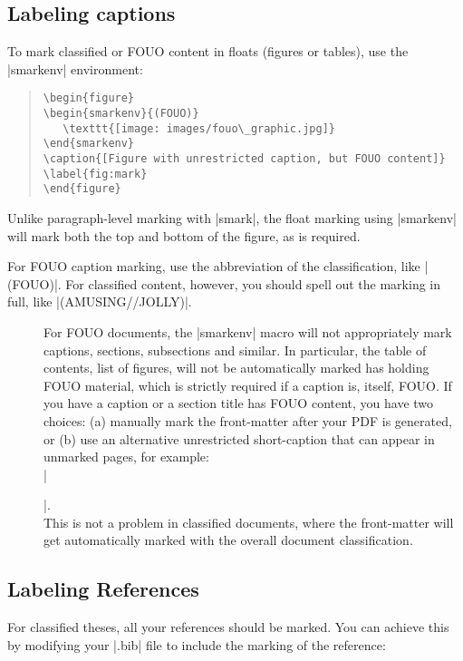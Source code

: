 \subsection{Labeling captions}
To mark classified or FOUO content in floats (figures or tables), use
the |smarkenv| environment:

\begin{quotation}
\begin{Verbatim}[fontsize=\small]
\begin{figure}
\begin{smarkenv}{(FOUO)}
   \texttt{[image: images/fouo\_graphic.jpg]}
\end{smarkenv}
\caption{[Figure with unrestricted caption, but FOUO content]}
\label{fig:mark}
\end{figure}
\end{Verbatim}
\end{quotation}
Unlike paragraph-level marking with |smark|, the float marking using |smarkenv| 
will mark both the top and bottom of the figure, as is required.

For FOUO caption marking, use the abbreviation of the classification, like |(FOUO)|.
For classified content, however, you should spell out the marking in full, like |(AMUSING//JOLLY)|.

\begin{description}
\item[]
For FOUO documents, the |smarkenv| macro will not appropriately mark
captions, sections, subsections and similar.
In particular, the table of contents, list of figures, \etc will not be automatically
marked has holding FOUO material, which is strictly required if a caption is, itself, FOUO. 
If you have a caption or a section title has FOUO content, you have two choices:
(a) manually mark the front-matter after your PDF is generated, or 
(b) use an alternative unrestricted short-caption that can appear 
in unmarked pages, for example:\\
 |\caption[Redacted Caption.]{(FOUO) This is a restricted title}|.\\
This is not a problem in classified documents, where the front-matter 
will get automatically marked with the overall document classification.
\end{description}

\subsection{Labeling References}
For classified theses, all your references should be marked. You can achieve this
by modifying your |.bib| file to include the marking of the reference:

